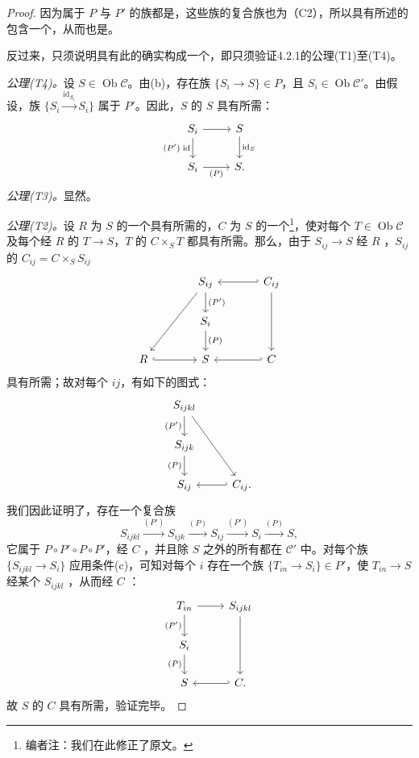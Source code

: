 \begin{proof}
因为属于 $P$ 与 $P'$ 的族都是，这些族的复合族也为（C2），所以具有所述的包含一个，从而也是。

反过来，只须说明具有此的确实构成一个，即只须验证4.2.1的公理(T1)至(T4)。

\textit{公理(T4)。}设 $S\in\operatorname{Ob}\mathcal C$。由(b)，存在族 $\{S_i\to S\}\in P$，且 $S_i\in\operatorname{Ob}\mathcal C'$。由假设，族 $\{S_i\xrightarrow{\mathrm{id}_{S_i}}S_i\}$ 属于 $P'$。因此，$S$ 的 $S$ 具有所需：
\[
\begin{tikzcd}
S_i\arrow[r]\arrow[d,"(P')\;\mathrm{id}"']&S\arrow[d,"\mathrm{id}_S"]\\
S_i\arrow[r,"(P)"']&S.
\end{tikzcd}
\]
\textit{公理(T3)。}显然。

\textit{公理(T2)。}设 $R$ 为 $S$ 的一个具有所需的，$C$ 为 $S$ 的一个\footnote{编者注：我们在此修正了原文。}，使对每个 $T\in\operatorname{Ob}\mathcal C$ 及每个经 $R$ 的 $T\to S$，$T$ 的 $C\times_S T$ 都具有所需。那么，由于 $S_{ij}\to S$ 经 $R$ ，$S_{ij}$ 的 $C_{ij}=C\times_S S_{ij}$
\[
\begin{tikzcd}[column sep=large]
&S_{ij}\arrow[d,"(P')"]&C_{ij}\arrow[l,hook']\arrow[dd]\\
&S_i\arrow[d,"(P)"]&\\
R\arrow[r,hook]&S&C\arrow[l,hook']
\arrow[from=1-2,to=3-1]
\end{tikzcd}
\]
具有所需；故对每个 $ij$，有如下的图式：
\[
\begin{tikzcd}
S_{ijkl}\arrow[d,"(P')"']\arrow[ddr] &\\
S_{ijk}\arrow[d,"(P)"']&\\
S_{ij}&C_{ij}\arrow[l,hook'].
\end{tikzcd}
\]
我们因此证明了，存在一个复合族
\[
S_{ijkl}\xrightarrow{(P')}S_{ijk}\xrightarrow{(P)}S_{ij}
\xrightarrow{(P')}S_i\xrightarrow{(P)}S,
\]
它属于 $P\circ P'\circ P\circ P'$，经 $C$ ，并且除 $S$ 之外的所有都在 $\mathcal C'$ 中。对每个族 $\{S_{ijkl}\to S_i\}$ 应用条件(c)，可知对每个 $i$ 存在一个族 $\{T_{in}\to S_i\}\in P'$，使 $T_{in}\to S$ 经某个 $S_{ijkl}$ ，从而经 $C$ ：
\[
\begin{tikzcd}
T_{in}\arrow[r]\arrow[d,"(P')"']&S_{ijkl}\arrow[dd]\\
S_i\arrow[d,"(P)"']&\\
S&C\arrow[l,hook'].
\end{tikzcd}
\]
故 $S$ 的 $C$ 具有所需，验证完毕。


\end{proof}
